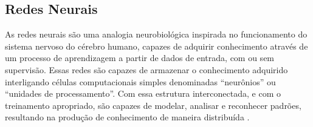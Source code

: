 



\subsection{Redes Neurais}


As redes neurais são uma analogia neurobiológica inspirada no funcionamento do sistema nervoso do cérebro humano, capazes de adquirir conhecimento através de um processo de aprendizagem a partir de dados de entrada, com ou sem supervisão. Essas redes são capazes de armazenar o conhecimento adquirido interligando células computacionais simples denominadas ``neurônios'' ou ``unidades de processamento''. Com essa estrutura interconectada, e com o treinamento apropriado, são capazes de modelar, analisar e reconhecer padrões, resultando na produção de conhecimento de maneira distribuída \cite{Haykin2007}.


